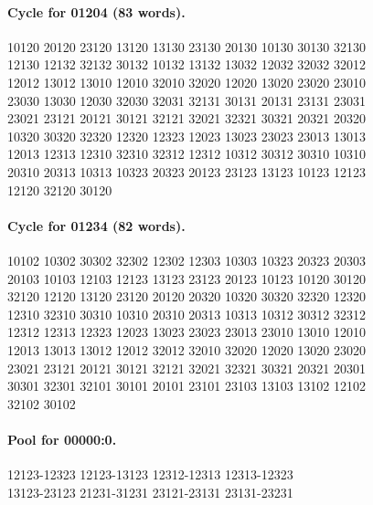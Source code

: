 \documentclass[11pt]{article}
\theoremstyle{remark}
\numberwithin{equation}{section}
\numberwithin{table}{section}
\begin{document}
\paragraph{Cycle for 01204 (83 words).}
\begingroup\footnotesize\ttfamily\begin{flushleft}
10120 20120 23120 13120 13130 23130 20130 10130 30130 32130\\
12130 12132 32132 30132 10132 13132 13032 12032 32032 32012\\
12012 13012 13010 12010 32010 32020 12020 13020 23020 23010\\
23030 13030 12030 32030 32031 32131 30131 20131 23131 23031\\
23021 23121 20121 30121 32121 32021 32321 30321 20321 20320\\
10320 30320 32320 12320 12323 12023 13023 23023 23013 13013\\
12013 12313 12310 32310 32312 12312 10312 30312 30310 10310\\
20310 20313 10313 10323 20323 20123 23123 13123 10123 12123\\
12120 32120 30120\\
\end{flushleft}\endgroup
\paragraph{Cycle for 01234 (82 words).}
\begingroup\footnotesize\ttfamily\begin{flushleft}
10102 10302 30302 32302 12302 12303 10303 10323 20323 20303\\
20103 10103 12103 12123 13123 23123 20123 10123 10120 30120\\
32120 12120 13120 23120 20120 20320 10320 30320 32320 12320\\
12310 32310 30310 10310 20310 20313 10313 10312 30312 32312\\
12312 12313 12323 12023 13023 23023 23013 23010 13010 12010\\
12013 13013 13012 12012 32012 32010 32020 12020 13020 23020\\
23021 23121 20121 30121 32121 32021 32321 30321 20321 20301\\
30301 32301 32101 30101 20101 23101 23103 13103 13102 12102\\
32102 30102\\
\end{flushleft}\endgroup
\paragraph{Pool for 00000:0.}
\begingroup\footnotesize\ttfamily\begin{flushleft}
12123-12323 12123-13123 12312-12313 12313-12323\\
13123-23123 21231-31231 23121-23131 23131-23231\\
\end{flushleft}\endgroup
\end{document}
